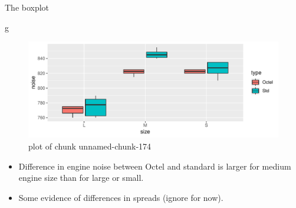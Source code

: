 \documentclass[ignorenonframetext,]{beamer}
\newenvironment{Shaded}{\begin{snugshade}}{\end{snugshade}}
\newcommand{\NormalTok}[1]{#1}
\begin{document}
\begin{frame}[fragile]{The boxplot}
\protect\hypertarget{the-boxplot}{}

\begin{Shaded}
\begin{Highlighting}[]
\NormalTok{g}
\end{Highlighting}
\end{Shaded}

\begin{figure}
\centering
\includegraphics{figure/unnamed-chunk-174-1.pdf}
\caption{plot of chunk unnamed-chunk-174}
\end{figure}

\begin{itemize}
\item
  Difference in engine noise between Octel and standard is larger for
  medium engine size than for large or small.
\item
  Some evidence of differences in spreads (ignore for now).
\end{itemize}

\end{frame}
\end{document}
